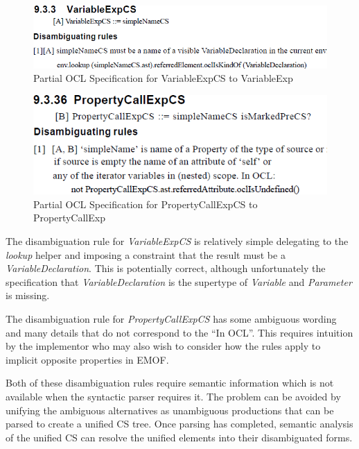 \documentclass{llncs}
\begin{document}
\begin{figure}[htbp]
	\centering
	\includegraphics[scale=0.49]{images/VariablExpGrammar.PNG}
	\caption{Partial OCL Specification for VariableExpCS to VariableExp}
	\label{fig:varExpGrammar}
\end{figure}

\begin{figure}[htbp]
	\includegraphics[scale=0.5]{images/PropertyCallExpGrammar.PNG}
	\caption{Partial OCL Specification for PropertyCallExpCS to PropertyCallExp}
	\label{fig:propCallExpGrammar}
\end{figure}

The disambiguation rule for \emph{VariableExpCS} is relatively simple delegating to the \emph{lookup} helper and imposing a constraint that the result must be a \emph{VariableDeclaration}. This is potentially correct, although unfortunately the specification that \emph{VariableDeclaration} is the supertype of \emph{Variable} and \emph{Parameter} is missing.

The disambiguation rule for \emph{PropertyCallExpCS} has some ambiguous wording and many details that do not correspond to the ``In OCL''. This requires intuition by the implementor who may also wish to consider how the rules apply to implicit opposite properties in EMOF.

Both of these disambiguation rules require semantic information which is not available when the syntactic parser requires it. The problem can be avoided by unifying the ambiguous alternatives as unambiguous productions that can be parsed to create a unified CS tree. Once parsing has completed, semantic analysis of the unified CS can resolve the unified elements into their  disambiguated forms.
\end{document}
